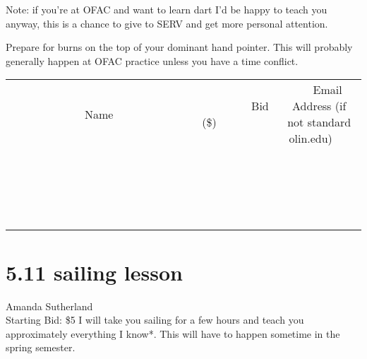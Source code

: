 \documentclass[11pt]{article}
\begin{document}
Note: if you're at OFAC and want to learn dart I'd be happy to teach you anyway, this is a chance to give to SERV and get more personal attention.

Prepare for burns on the top of your dominant hand pointer. This will probably generally happen at OFAC practice unless you have a time conflict.
\\[3ex]
\begin{tabular}{c c c}
~~~~~~~~~~~~~Name~~~~~~~~~~~~~ & ~~~~~~~~~Bid (\$)~~~~~~~~~  & ~~~Email Address (if not standard olin.edu)~~~\\
 & & \\
\hline
 & & \\
\hline
 & & \\
\hline
 & & \\
\hline
 & & \\
\hline
 & & \\
\hline
 & & \\
\hline
 & & \\
\hline
 & & \\
\hline
 & & \\
\hline
 & & \\
\hline
 & & \\
\hline
 & & \\
\hline
 & & \\
\hline
 & & \\
\hline
 & & \\
\hline
 & & \\
\hline
 & & \\
\hline
 & & \\
\hline
\end{tabular}
\newpage
\section*{5.11 sailing lesson}
Amanda Sutherland
\\
Starting Bid: \$5
\newline
I will take you sailing for a few hours and teach you approximately everything I know*. This will have to happen sometime in the spring semester. 
\end{document}
